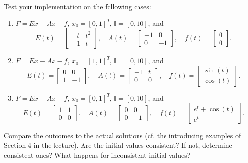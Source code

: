 \documentclass[a4paper,10pt]{article}
\begin{document}
\begin{enumerate}
		Test your implementation on the following cases:
		\begin{enumerate}
			\item $F = E\dot x - Ax -f$, $x_0=[0,1]^T$, $\mathbb I = [0,10]$, and
				\begin{equation*}
					E(t) = 
					\begin{bmatrix} -t &t^2 \\ -1 &t
					\end{bmatrix}, \quad
					A(t) = 
					\begin{bmatrix} -1 &0 \\ 0 &-1
					\end{bmatrix}, \quad
					f(t) = 
					\begin{bmatrix} 0 \\ 0
					\end{bmatrix}.
				\end{equation*}
			\item $F = E\dot x - Ax -f$, $x_0=[1,1]^T$, $\mathbb I = [0,10]$, and
				\begin{equation*}
					E(t) = 
					\begin{bmatrix} 0 & 0 \\ 1 & -1
					\end{bmatrix}, \quad
					A(t) = 
					\begin{bmatrix} -1 &t \\ 0 & 0
					\end{bmatrix}, \quad
					f(t) = 
					\begin{bmatrix} \sin(t) \\ \cos(t)
					\end{bmatrix}.
				\end{equation*}
			\item $F = E\dot x - Ax -f$, $x_0=[0,1]^T$, $\mathbb I = [0,10]$, and
				\begin{equation*}
					E(t) = 
					\begin{bmatrix} 1 & 1 \\ 0 & 0
					\end{bmatrix}, \quad
					A(t) = 
					\begin{bmatrix} 0 &0 \\ 0 &-1
					\end{bmatrix}, \quad
					f(t) = 
					\begin{bmatrix} e^t+\cos(t) \\ e^t
					\end{bmatrix}.
				\end{equation*}
		\end{enumerate}
		Compare the outcomes to the actual solutions (cf. the introducing examples of Section 4 in the lecture). Are the initial values consistent? If not, determine consistent ones? What happens for inconsistent initial values?
\end{enumerate}
\end{document}
